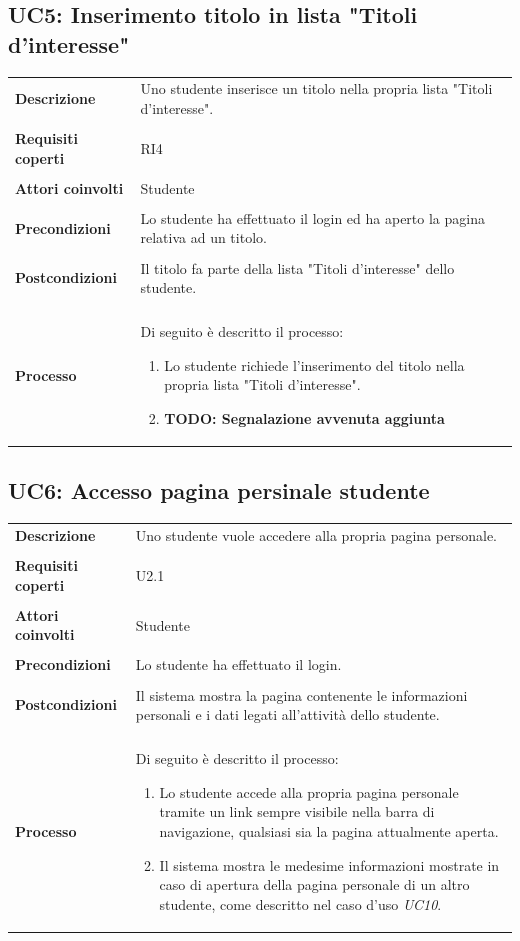 \documentclass[10pt,a4paper]{report}
\begin{document}
	\subsection{UC5: Inserimento titolo in lista "Titoli d'interesse"}
	\begin{tabular}{lp{}}
		\textbf{Descrizione}&Uno studente inserisce un titolo nella propria lista "Titoli d'interesse".\\
		\\
		\textbf{Requisiti coperti}&RI4\\
		\\
		\textbf{Attori coinvolti}&Studente\\
		\\
		\textbf{Precondizioni}&Lo studente ha effettuato il login ed ha aperto la pagina relativa ad un titolo.\\
		\\
		\textbf{Postcondizioni}&Il titolo fa parte della lista "Titoli d'interesse" dello studente.\\
		\\
		\textbf{Processo}&Di seguito è descritto il processo:
		\begin{enumerate}
			\item Lo studente richiede l'inserimento del titolo nella propria lista "Titoli d'interesse".
			\item \textbf{TODO: Segnalazione avvenuta aggiunta}
		\end{enumerate}
	\end{tabular}

	\subsection{UC6: Accesso pagina persinale studente}
	\begin{tabular}{lp{}}
		\textbf{Descrizione}&Uno studente vuole accedere alla propria pagina personale.\\
		\\
		\textbf{Requisiti coperti}&U2.1\\
		\\
		\textbf{Attori coinvolti}&Studente\\
		\\
		\textbf{Precondizioni}&Lo studente ha effettuato il login.\\
		\\
		\textbf{Postcondizioni}&Il sistema mostra la pagina contenente le informazioni personali e i dati legati all'attività dello studente.\\
		\\
		\textbf{Processo}&Di seguito è descritto il processo:
		\begin{enumerate}
			\item Lo studente accede alla propria pagina personale tramite un link sempre visibile nella barra di navigazione, qualsiasi sia la pagina attualmente aperta.
			\item Il sistema mostra le medesime informazioni mostrate in caso di apertura della pagina personale di un altro studente, come descritto nel caso d'uso \textit{UC10}.
		\end{enumerate}
	\end{tabular}
\end{document}
